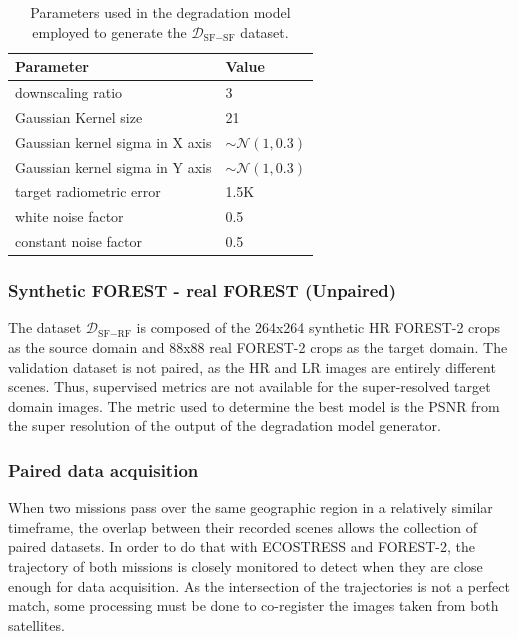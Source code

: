     \begin{table}[H]
        \centering
        \begin{tabular}{l|l}
        Parameter & Value \\ \hline
        downscaling ratio & 3 \\ 
        Gaussian Kernel size & 21 \\ 
        Gaussian kernel sigma in X axis &  $\sim \mathcal{N}(1,0.3)$  \\ 
        Gaussian kernel sigma in Y axis &  $\sim \mathcal{N}(1,0.3)$  \\ 
        target radiometric error & 1.5K \\ 
        white noise factor & 0.5 \\ 
        constant noise factor & 0.5 \\ 
        \end{tabular}
        \caption{Parameters used in the degradation model employed to generate the $\mathcal{D}_{\text{SF}-\text{SF}}$ dataset.}
        \label{tab:degradation_model_parameters}
    \end{table}

\subsubsection{Synthetic FOREST - real FOREST (Unpaired)}
    The dataset $\mathcal{D}_{\text{SF}-\text{RF}}$ is composed of the 264x264 synthetic HR FOREST-2 crops as the source domain and  88x88 real FOREST-2 crops as the target domain. 
    The validation dataset is not paired, as the HR and LR images are entirely different scenes.
    Thus, supervised metrics are not available for the super-resolved target domain images. 
    The metric used to determine the best model is the PSNR from the super resolution of the output of the degradation model generator.

\subsubsection{Paired data acquisition} \label{subsec:pairedacquisition}

    When two missions pass over the same geographic region in a relatively similar timeframe, the overlap between their recorded scenes allows the collection of paired datasets. In order to do that with ECOSTRESS and FOREST-2, the trajectory of both missions is closely monitored to detect when they are close enough for data acquisition. As the intersection of the trajectories is not a perfect match, some processing must be done to co-register the images taken from both satellites. 

